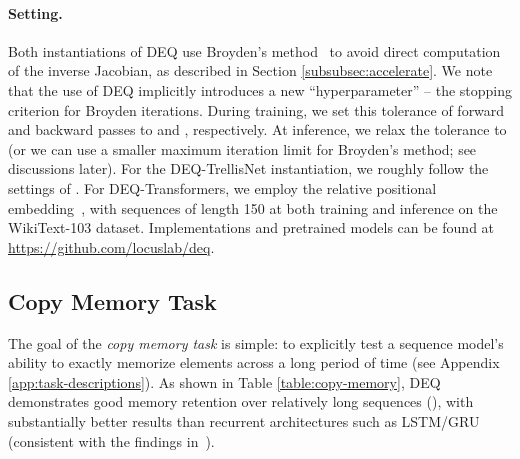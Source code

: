 \documentclass{article}
\begin{document}
\paragraph{Setting.} Both instantiations of DEQ use Broyden's method~\cite{broyden1965class} to avoid direct computation of the inverse Jacobian, as described in Section \ref{subsubsec:accelerate}. We note that the use of DEQ implicitly introduces a new ``hyperparameter'' -- the stopping criterion for Broyden iterations. During training, we set this tolerance  of forward and backward passes to  and , respectively. At inference, we relax the tolerance to  (or we can use a smaller maximum iteration limit for Broyden's method; see discussions later). For the DEQ-TrellisNet instantiation, we roughly follow the settings of \cite{bai2018trellis}. For DEQ-Transformers, we employ the relative positional embedding~\cite{dai2018transformer}, with sequences of length 150 at both training and inference on the WikiText-103 dataset. Implementations and pretrained models can be found at \url{https://github.com/locuslab/deq}.

\subsection{Copy Memory Task}

\begin{table*}[t]
\caption{DEQ achieves strong performance on the long-range copy-memory task.}
\vspace{-1mm}
\label{table:copy-memory}
\centering
\def\arraystretch{1.1}
\end{table*}

The goal of the \emph{copy memory task} is simple: to explicitly test a sequence model's ability to exactly memorize elements across a long period of time (see Appendix \ref{app:task-descriptions}). As shown in Table \ref{table:copy-memory}, DEQ demonstrates good memory retention over relatively long sequences (), with substantially better results than recurrent architectures such as LSTM/GRU (consistent with the findings in~\cite{bai2018empirical}).
\end{document}

